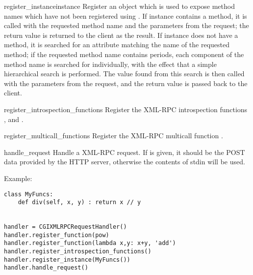\begin{methoddesc}{register_instance}{instance}
Register an object which is used to expose method names 
which have not been registered using . If 
instance contains a  method, it is called with the 
requested method name and the parameters from the 
request; the return value is returned to the client as the result.
If instance does not have a  method, it is searched 
for an attribute matching the name of the requested method; if 
the requested method name contains periods, each 
component of the method name is searched for individually, 
with the effect that a simple hierarchical search is performed. 
The value found from this search is then called with the 
parameters from the request, and the return value is passed 
back to the client. 
\end{methoddesc}

\begin{methoddesc}{register_introspection_functions}{}
Register the XML-RPC introspection functions 
,  and 
.
\end{methoddesc}

\begin{methoddesc}{register_multicall_functions}{}
Register the XML-RPC multicall function .
\end{methoddesc}

\begin{methoddesc}{handle_request}{}
Handle a XML-RPC request. If  is given, it 
should be the POST data provided by the HTTP server, 
otherwise the contents of stdin will be used.
\end{methoddesc}

Example:

\begin{verbatim}
class MyFuncs:
    def div(self, x, y) : return x // y


handler = CGIXMLRPCRequestHandler()
handler.register_function(pow)
handler.register_function(lambda x,y: x+y, 'add')
handler.register_introspection_functions()
handler.register_instance(MyFuncs())
handler.handle_request()
\end{verbatim}
